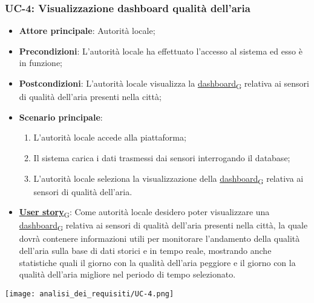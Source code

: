 \subsubsection{UC-4: Visualizzazione dashboard qualità dell'aria}
\begin{itemize}
	\item \textbf{Attore principale}: Autorità locale;
	\item \textbf{Precondizioni}: L'autorità locale ha effettuato l'accesso al sistema ed esso è in funzione;
	\item \textbf{Postcondizioni}: L'autorità locale visualizza la \href{https://7last.github.io/docs/rtb/documentazione-interna/glossario\#dashboard}{dashboard\textsubscript{G}} relativa
	      ai sensori di qualità dell'aria presenti nella città;
	\item \textbf{Scenario principale}:
	      \begin{enumerate}
		      \item L'autorità locale accede alla piattaforma;
		      \item Il sistema carica i dati trasmessi dai sensori interrogando il database;
		      \item L'autorità locale seleziona la visualizzazione della \href{https://7last.github.io/docs/rtb/documentazione-interna/glossario\#dashboard}{dashboard\textsubscript{G}} relativa ai sensori di qualità dell'aria.
	      \end{enumerate}
	\item \href{https://7last.github.io/docs/rtb/documentazione-interna/glossario\#user-story}{\textbf{User story}\textsubscript{G}}:
	      Come autorità locale desidero poter visualizzare una \href{https://7last.github.io/docs/rtb/documentazione-interna/glossario\#dashboard}{dashboard\textsubscript{G}} relativa ai sensori di qualità dell'aria presenti nella città, la quale
	      dovrà contenere informazioni utili per monitorare l'andamento della qualità dell'aria sulla base di dati storici e in tempo reale, mostrando
	      anche statistiche quali il giorno con la qualità dell'aria peggiore e il giorno con la qualità dell'aria migliore nel periodo di tempo selezionato.
\end{itemize}
\begin{center}
	\texttt{[image: analisi\_dei\_requisiti/UC-4.png]}
\end{center}


